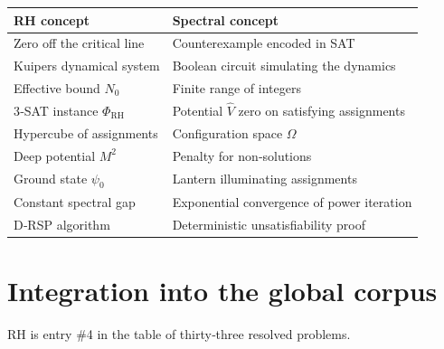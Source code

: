 \documentclass[11pt,a4paper]{article}
\begin{document}
\begin{center}
\small
\begin{tabular}{@{}l|l@{}}
\toprule
\textbf{RH concept} & \textbf{Spectral concept} \\
\midrule
Zero off the critical line & Counterexample encoded in SAT \\
Kuipers dynamical system & Boolean circuit simulating the dynamics \\
Effective bound \(N_0\) & Finite range of integers \\
3‑SAT instance \(\Phi_{\text{RH}}\) & Potential \(\hat{V}\) zero on satisfying assignments \\
Hypercube of assignments & Configuration space \(\Omega\) \\
Deep potential \(M^2\) & Penalty for non‑solutions \\
Ground state \(\psi_0\) & Lantern illuminating assignments \\
Constant spectral gap & Exponential convergence of power iteration \\
D‑RSP algorithm & Deterministic unsatisfiability proof \\
\bottomrule
\end{tabular}
\end{center}

\section{Integration into the global corpus}

RH is entry \#4 in the table of thirty‑three resolved problems.
\end{document}
